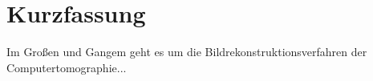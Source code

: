
\chapter{Kurzfassung}

Im Großen und Gangem geht es um die Bildrekonstruktionsverfahren der Computertomographie...